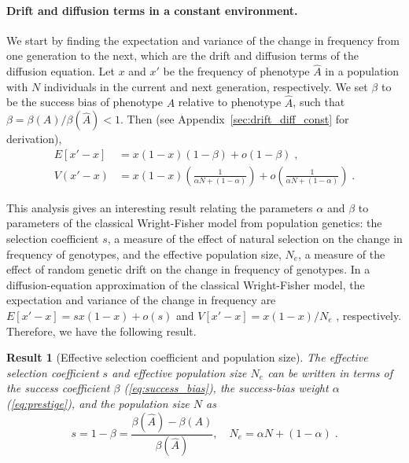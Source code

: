 \documentclass[12pt]{extarticle}
\newtheorem{result}{Result}
\begin{document}
\paragraph{Drift and diffusion terms in a constant environment.}
We start by finding the expectation and variance of the change in frequency from one generation to the next, which are the drift and diffusion terms of the diffusion equation.
Let $x$ and $x'$ be the frequency of phenotype $\hat{A}$ in a population with $N$ individuals in the current and next generation, respectively.
We set $\beta$ to be the success bias of phenotype $A$ relative to phenotype $\hat{A}$, such that $\beta = \beta(A)/\beta(\hat{A}) < 1$.
Then (see Appendix~\ref{sec:drift_diff_const} for derivation),
\begin{equation}\label{eq:drift_diff}
\begin{aligned}
E[x'-x] &= x(1-x)(1-\beta) + o(1-\beta)  \;, 
\\
V(x'-x) &= x(1-x)\left(\frac{1}{\alpha N + (1-\alpha)}\right) + o\left(\frac{1}{\alpha N + (1-\alpha)}\right) \;.
\end{aligned}\end{equation} 

This analysis gives an interesting result relating the parameters $\alpha$ and $\beta$ to parameters of the classical Wright-Fisher model from population genetics:
the selection coefficient $s$, a measure of the effect of natural selection on the change in frequency of genotypes, and the effective population size, $N_e$, a measure of the effect of random genetic drift on the change in frequency of genotypes. 
In a diffusion-equation approximation of the classical Wright-Fisher model, the expectation and variance of the change in frequency are $E[x'-x]=sx(1-x)+o(s)$ and $V[x'-x]=x(1-x)/N_e$ \citep[eq.~7]{kimura}{, respectively}. 
Therefore, we have the following result.\\

\begin{result}[Effective selection coefficient and population size]\label{res:selection_coef}
The effective selection coefficient $s$ and effective population size $N_e$ can be written in terms of the success coefficient $\beta$ (\cref{eq:success_bias}), the success-bias weight $\alpha$ (\cref{eq:prestige}), and the population size $N$ as 
\begin{equation}\label{eq:effective}
s=1-\beta=\frac{\beta(\hat{A})-\beta(A)}{\beta(\hat{A})}, \quad N_e=\alpha N + (1-\alpha) \;.
\end{equation}
\end{result}
\end{document}
